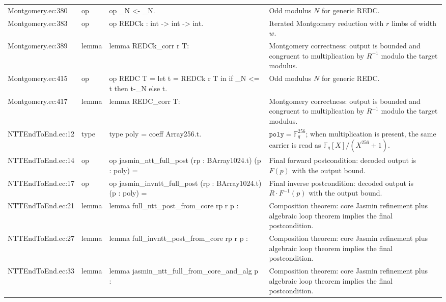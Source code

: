 \documentclass[10pt]{article}
\begin{document}
\begin{longtable}{L{0.11\textwidth}L{0.05\textwidth}L{0.38\textwidth}L{0.42\textwidth}}
Montgomery.\allowbreak{}ec:\allowbreak{}380 & op & {\ttfamily\scriptsize op \_N <- \_N.} & Odd modulus $N$ for generic REDC. \\
Montgomery.\allowbreak{}ec:\allowbreak{}383 & op & {\ttfamily\scriptsize op REDCk : int -> int -> int.} & Iterated Montgomery reduction with $r$ limbs of width $w$. \\
Montgomery.\allowbreak{}ec:\allowbreak{}389 & lemma & {\ttfamily\scriptsize lemma REDCk\_corr r T:} & Montgomery correctness: output is bounded and congruent to multiplication by $R^{-1}$ modulo the target modulus. \\
Montgomery.\allowbreak{}ec:\allowbreak{}415 & op & {\ttfamily\scriptsize op REDC T = let t = REDCk r T in if \_N <= t then t-\_N else t.} & Odd modulus $N$ for generic REDC. \\
Montgomery.\allowbreak{}ec:\allowbreak{}417 & lemma & {\ttfamily\scriptsize lemma REDC\_corr T:} & Montgomery correctness: output is bounded and congruent to multiplication by $R^{-1}$ modulo the target modulus. \\
NTTEndToEnd.\allowbreak{}ec:\allowbreak{}12 & type & {\ttfamily\scriptsize type poly = coeff Array256.t.} & $\mathtt{poly}=\mathbb F_q^{256}$; when multiplication is present, the same carrier is read as $\mathbb F_q[X]/(X^{256}+1)$. \\
NTTEndToEnd.\allowbreak{}ec:\allowbreak{}14 & op & {\ttfamily\scriptsize op jasmin\_ntt\_full\_post (rp : BArray1024.t) (p : poly) =} & Final forward postcondition: decoded output is $F(p)$ with the output bound. \\
NTTEndToEnd.\allowbreak{}ec:\allowbreak{}17 & op & {\ttfamily\scriptsize op jasmin\_invntt\_full\_post (rp : BArray1024.t) (p : poly) =} & Final inverse postcondition: decoded output is $R\cdot F^{-1}(p)$ with the output bound. \\
NTTEndToEnd.\allowbreak{}ec:\allowbreak{}21 & lemma & {\ttfamily\scriptsize lemma full\_ntt\_post\_from\_core rp r p :} & Composition theorem: core Jasmin refinement plus algebraic loop theorem implies the final postcondition. \\
NTTEndToEnd.\allowbreak{}ec:\allowbreak{}27 & lemma & {\ttfamily\scriptsize lemma full\_invntt\_post\_from\_core rp r p :} & Composition theorem: core Jasmin refinement plus algebraic loop theorem implies the final postcondition. \\
NTTEndToEnd.\allowbreak{}ec:\allowbreak{}33 & lemma & {\ttfamily\scriptsize lemma jasmin\_ntt\_full\_from\_core\_and\_alg p :} & Composition theorem: core Jasmin refinement plus algebraic loop theorem implies the final postcondition. \\

\end{longtable}
\end{document}
